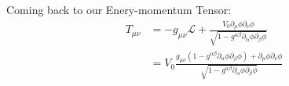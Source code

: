 \begin{enumerate}[label=(\alph*)]
Coming back to our Enery-momentum Tensor:
\begin{align}
	T_{\mu\nu} 	&= -g_{\mu\nu} \mathcal{L} + \frac{V_0 \partial_\mu \phi \partial_\nu \phi}{\sqrt{1-g^{\alpha\beta} \partial_\alpha \phi \partial_\beta \phi }}   \\
				&= V_0\frac{ g_{\mu\nu}(1-g^{\alpha\beta} \partial_\alpha \phi \partial_\beta \phi) + \partial_\mu \phi \partial_\nu \phi}{\sqrt{1-g^{\alpha\beta} \partial_\alpha \phi \partial_\beta \phi }}
\end{align}


\end{enumerate}

